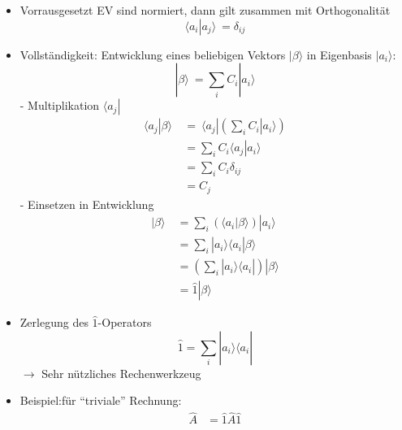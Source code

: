 \documentclass[10pt,article,colorback,accentcolor=tud9d]{scrartcl}
\begin{document}
\begin{fleqn}
\begin{itemize}
  \item Vorrausgesetzt EV sind normiert, dann gilt zusammen mit Orthogonalität 
    \begin{equation}
    \langle a_i\left.\right|a_j\rangle  \ = \delta_{ij}
    \end{equation}
  \item Vollständigkeit: Entwicklung eines beliebigen Vektors $\left.\right|\beta\rangle $ in Eigenbasis $\left.\right|a_i\rangle $:
    \begin{equation}
    \left.\right|\beta\rangle  \ = \sum_i C_i \left.\right|a_i \rangle 
    \end{equation}
    - Multiplikation $\langle a_j\left.\right|$
      \begin{equation}
      \begin{aligned}
      \langle a_j\left.\right|\beta\rangle  \ &= \ \langle a_j\left.\right|\left(\sum_i C_i\left.\right|a_i\rangle \right)\\
      &=\sum_iC_i\langle a_j\left.\right|a_i\rangle \\
      &=\sum_iC_i \delta_{ij}\\
      &=C_j
      \end{aligned}
      \end{equation}
    - Einsetzen in Entwicklung
    \begin{equation}
    \begin{aligned}
      \left.\right|\beta\rangle  \ &= \sum_i\left(\langle a_i\left.\right|\beta\rangle \right) \left.\right|a_i\rangle \\
      &=\sum_i\left.\right|a_i\rangle \langle a_i\left.\right|\beta\rangle \\
      &=\left(\sum_i\left.\right|a_i\rangle \langle a_i\left.\right|\right)\left.\right|\beta\rangle \\
      &=\hat{1}\left.\right|\beta\rangle 
    \end{aligned}
    \end{equation}
  \item Zerlegung des $\hat{1}$-Operators
    \begin{equation}
    \hat{1}= \sum_i \left.\right|a_i\rangle \langle a_i\left.\right|
    \end{equation}
    $\rightarrow$ Sehr nützliches Rechenwerkzeug
  \item Beispiel:für "`triviale"' Rechnung:
    \begin{equation}
    \begin{aligned}
    \hat{A} &= \hat{1}\hat{A}\hat{1}\\

\end{aligned}
\end{equation}
\end{itemize}
\end{fleqn}
\end{document}
